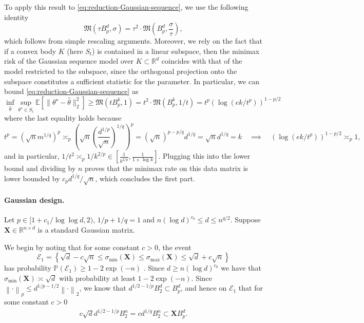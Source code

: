 \documentclass[a4paper]{article}
\newcommand{\mathset}[1]{\left\{#1\right\}}
\newcommand{\pr}[1]{\left(#1\right)}
\newcommand{\br}[1]{\left[#1\right]}
\newcommand{\norm}[1]{\left\|#1\right\|}
\newcommand{\X}[0]{\mathbf{X}}
\newcommand{\EE}[0]{\mathbb{E}}
\newcommand{\RR}[0]{\mathbb{R}}
\newcommand{\PP}[0]{\mathbb{P}}
\newcommand{\cE}[0]{\mathcal{E}}
\theoremstyle{thmstyle}
\theoremstyle{defstyle}
\theoremstyle{remark}
\begin{document}
To apply this result to \cref{eq:reduction-Gaussian-sequence}, we use the following identity
\begin{equation*}
    \mathfrak{M}(\tau B_p^d,\sigma) = \tau^2 \cdot \mathfrak{M}\pr{ B_p^d,\frac{\sigma}{\tau}},
\end{equation*}
which follows from simple rescaling arguments. Moreover, we rely on the fact that if a convex body 
$K$ (here $S_t$) is contained in a linear subspace, then the minimax risk of the Gaussian sequence model over $K\subset\RR^d$ coincides with that of the model restricted to the subspace, since the orthogonal projection onto the subspace constitutes a sufficient statistic for the parameter. In particular, we can bound \cref{eq:reduction-Gaussian-sequence} as
\begin{equation*}
    \inf_{\widehat \theta}\sup_{\theta^\star\in S_t}\EE\br{\|\theta^\star-\widehat \theta\|_2^2} \geq \mathfrak{M}(t B_p^k,1) = t^2 \cdot \mathfrak{M}(B_p^k,1/t) = t^{p} \pr{\log\pr{ek/t^p}}^{1-p/2}
\end{equation*}
where the last equality holds because
\begin{equation*}
    t^p=\pr{\sqrt{n}m^{1/q}}^p \asymp_p \pr{\sqrt{n}\pr{\frac{d^{1/p}}{\sqrt{n}}}^{1/q}}^p = (\sqrt{n})^{p-p/q} d^{1/q}=\sqrt{n}d^{1/q} = k \quad \implies \quad \pr{\log\pr{ek/t^p}}^{1-p/2} \asymp_p 1,
\end{equation*}
and in particular, $1/t^2 \asymp_p 1/k^{2/p}  \in [\frac{1}{k^{2/p}}, \frac{1}{1+\log k}]$. Plugging this into the lower bound and dividing by $n$ proves that the minimax rate on this data matrix is lower bounded by $c_p d^{1/q}/\sqrt{n}$, which concludes the first part.

    \paragraph{Gaussian design.}
    Let $p\in[1+c_1/\log \log d,2)$, $1/p+1/q = 1$ and $ n(\log d)^{c_0} \leq d \leq n^{q/2}$. Suppose $\X\in\RR^{n\times d}$ is a standard Gaussian matrix. 
    
    
    We begin by noting that for some constant $c>0$, the event 
    \begin{equation*}
        \cE_1 = \mathset{\sqrt{d}-c\sqrt{n} \leq \sigma_{\min}(\X)\leq \sigma_{\max}(\X) \leq \sqrt{d}+c\sqrt{n}}
    \end{equation*}
    has probability $\PP\pr{\cE_1}\geq 1-2\exp\pr{-n}$ \citep[Theorem 4.6.1]{Vershynin2018}.
    Since $d\geq n(\log d)^{c_0}$ we have that $\sigma_{\min}(\X)\asymp \sqrt{d}$ with probability at least $1-2\exp\pr{-n}$. Since $\norm{\cdot}_p \leq d^{1/p-1/2} \norm{\cdot}_2$, we know that $d^{1/2-1/p} B_2^d\subset B_p^d$, and hence on $\cE_1$ that for some constant $c>0$
    \begin{align*}
          c \sqrt{d} d^{1/2-1/p} B_2^n = c d^{1/q} B_2^n \subset \X B_p^d.
    \end{align*}
    
\end{document}

